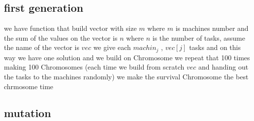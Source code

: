 \documentclass[11pt,fullpage]{article}
\begin{document}
\subsection{first generation}
we have function that build vector with size $m$ where $m$ is machines number and the sum of the values on the vector is $n$ where $n$ is the number of tasks, assume the name of the vector is $vec$ we give each $machin_j$ , $vec[j]$ tasks and on this way we have one solution and we build on Chromosome we repeat that 100 times making 100 Chromosomes (each time we build from scratch  $vec$ and handing out the tasks to the machines randomly) we make the survival Chromosome the best chrmosome  time
\subsection{mutation}


 

\end{document}
